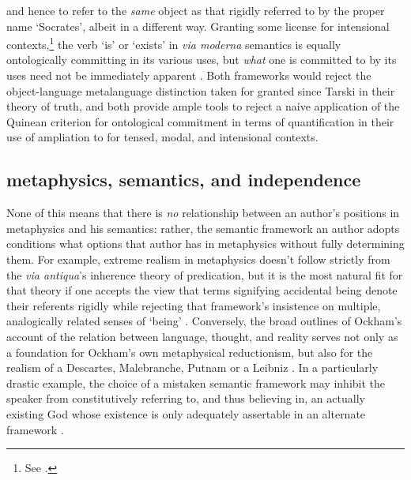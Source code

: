 \documentclass[]{article}
\begin{document}
and hence to refer to the \emph{same} object as that rigidly referred to by the proper name `Socrates', 
albeit in a different way. 
Granting some license for intensional contexts,\footnote{See \autocite{Klima2005}.} 
the verb `is' or `exists' in \emph{via moderna} semantics is equally ontologically committing in its various uses, 
but \emph{what} one is committed to by its uses need not be immediately apparent \autocite[437-430]{Klima2008a}.
Both frameworks would reject the object-language metalanguage distinction taken for granted since Tarski in their theory of truth,
and both provide ample tools to reject a naive application of the Quinean criterion for ontological commitment in terms of quantification in their use of ampliation to for tensed, modal, and intensional contexts.

\subsection{metaphysics, semantics, and independence}
None of this means that there is \emph{no} relationship between an author's positions in metaphysics and his semantics: 
rather, the semantic framework an author adopts conditions what options that author has in metaphysics without fully determining them. 
For example, extreme realism in metaphysics doesn't follow strictly from the \emph{via antiqua}'s inherence theory of predication, 
but it is the most natural fit for that theory 
if one accepts the view that terms signifying accidental being denote their referents rigidly 
while rejecting that framework's insistence on multiple, analogically related senses of `being' \autocite{Klima1999}. 
Conversely, the broad outlines of Ockham's account of the relation between language, thought, and reality 
serves not only as a foundation for Ockham's own metaphysical reductionism, 
but also for the realism of a Descartes, Malebranche, Putnam or a Leibniz \autocite{Klima1991}. 
In a particularly drastic example, the choice of a mistaken semantic framework may inhibit the speaker from constitutively referring to, 
and thus believing in, 
an actually existing God whose existence is only adequately assertable in an alternate framework \autocite[74]{Klima2008b}. %
\end{document}
